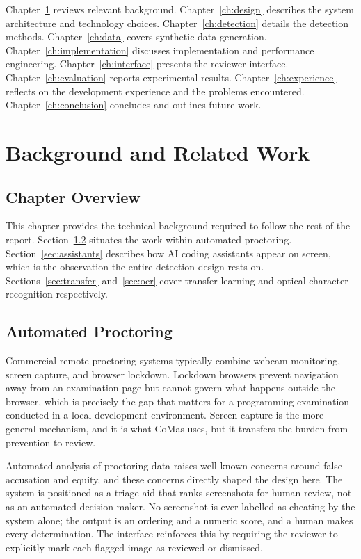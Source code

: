 \documentclass[12pt,oneside]{report}
\begin{document}
Chapter~\ref{ch:background} reviews relevant background. Chapter~\ref{ch:design}
describes the system architecture and technology choices.
Chapter~\ref{ch:detection} details the detection methods.
Chapter~\ref{ch:data} covers synthetic data generation.
Chapter~\ref{ch:implementation} discusses implementation and performance
engineering. Chapter~\ref{ch:interface} presents the reviewer interface.
Chapter~\ref{ch:evaluation} reports experimental results.
Chapter~\ref{ch:experience} reflects on the development experience and the
problems encountered. Chapter~\ref{ch:conclusion} concludes and outlines future
work.

\chapter{Background and Related Work}
\label{ch:background}

\section{Chapter Overview}

This chapter provides the technical background required to follow the rest of
the report. Section~\ref{sec:proctoring} situates the work within automated
proctoring. Section~\ref{sec:assistants} describes how AI coding assistants
appear on screen, which is the observation the entire detection design rests
on. Sections~\ref{sec:transfer} and~\ref{sec:ocr} cover transfer learning and
optical character recognition respectively.

\section{Automated Proctoring}
\label{sec:proctoring}

Commercial remote proctoring systems typically combine webcam monitoring, screen
capture, and browser lockdown. Lockdown browsers prevent navigation away from
an examination page but cannot govern what happens outside the browser, which
is precisely the gap that matters for a programming examination conducted in a
local development environment. Screen capture is the more general mechanism,
and it is what CoMas uses, but it transfers the burden from prevention to
review.

Automated analysis of proctoring data raises well-known concerns around false
accusation and equity, and these concerns directly shaped the design here. The
system is positioned as a triage aid that ranks screenshots for human review,
not as an automated decision-maker. No screenshot is ever labelled as cheating
by the system alone; the output is an ordering and a numeric score, and a human
makes every determination. The interface reinforces this by requiring the
reviewer to explicitly mark each flagged image as reviewed or dismissed.
\end{document}
